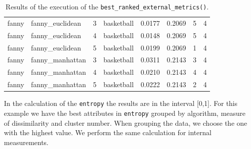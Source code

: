 \begin{itemize}
\begin{table}[h!]
\begin{tabular}{| p{1cm} | p{1.8cm} | p{0.9cm} | p{1.1cm} | p{1.6cm} | p{0.8cm} | p{1.8cm} | p{1.5cm} |}
\hline
\scriptsize fanny      & \scriptsize fanny\_euclidean & \scriptsize     3     & \scriptsize basketball  & \scriptsize     0.0177    & \scriptsize 0.2069 &  \scriptsize        5        & \scriptsize      4 \\
\scriptsize fanny      & \scriptsize fanny\_euclidean & \scriptsize     4     & \scriptsize basketball  & \scriptsize     0.0148    & \scriptsize 0.2069 &  \scriptsize        5        & \scriptsize      4 \\
\scriptsize fanny      & \scriptsize fanny\_euclidean & \scriptsize     5     & \scriptsize basketball  & \scriptsize     0.0199    & \scriptsize 0.2069 &  \scriptsize        1        & \scriptsize      4 \\
\cline{2-8}
\scriptsize fanny      & \scriptsize fanny\_manhattan & \scriptsize     3     & \scriptsize basketball  & \scriptsize     0.0311    & \scriptsize 0.2143 &  \scriptsize        3        & \scriptsize      4 \\
\scriptsize fanny      & \scriptsize fanny\_manhattan & \scriptsize     4     & \scriptsize basketball  & \scriptsize     0.0210    & \scriptsize 0.2143 &  \scriptsize        4        & \scriptsize      4 \\
\scriptsize fanny      & \scriptsize fanny\_manhattan & \scriptsize     5     & \scriptsize basketball  & \scriptsize     0.0222    & \scriptsize 0.2143 &  \scriptsize        2        & \scriptsize      4 \\
\hline
\end{tabular}
\caption{Results of the execution of the \texttt{best\_ranked\_external\_metrics()}.}
\label{tab:clusteringbestrankedexternalmetrics}
\end{table}

In the calculation of the \texttt{entropy} the results are in the interval [0,1]. For this example we have the best attributes in \texttt{entropy} grouped by algorithm, measure of dissimilarity and cluster number. When grouping the data, we choose the one with the highest value. We perform the same calculation for internal measurements.


\end{itemize}
